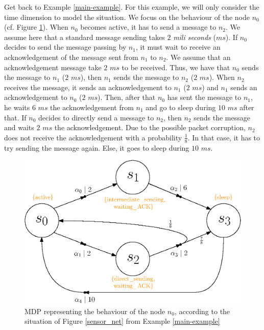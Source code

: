 \begin{example} \label{spg-example}
Get back to Example \ref{main-example}.
For this example, we will only consider the time dimension to model the situation.
We focus on the behaviour of the node $n_0$  (cf. Figure \ref{sensor_net_mdp}).
When $n_0$ becomes active, it has to send a message to $n_2$. We assume here that a standard message sending takes $2$ \textit{mili seconds} ($ms$). If $n_0$ decides to send the message passing by $n_1$, it must wait to receive an acknowledgement of the message sent from $n_1$ to $n_2$. We assume that an acknowledgement message take $2$ $ms$ to be received.
Thus, we have that $n_0$ sends the message to $n_1$ ($2$ $ms$), then $n_1$ sends the message to $n_2$ ($2$ $ms$). When $n_2$ receives the message, it sends an acknowledgement to $n_1$ ($2$ $ms$) and $n_1$ sends an acknowledgement to $n_0$ ($2$ $ms$).
Then, after that $n_0$ has sent the message to $n_1$, he waits $6$ $ms$ the acknowledgement from $n_1$ and go to sleep during $10$ $ms$ after that. If $n_0$ decides to directly send a message to $n_2$, then $n_2$ sends the message and waits $2$ $ms$ the acknowledgement.
Due to the possible packet corruption, $n_2$ does not receive the acknowledgement with a probability $\frac{1}{8}$. In that case, it has to try sending the message again.
Else, it goes to sleep during $10$ $ms$.
\begin{figure}[h]
  \centering
  \includegraphics[width=0.6\linewidth]{resources/example3.eps}
  \captionsetup{justification=centering}
  \caption{MDP representing the behaviour of the node $n_0$, according to the situation of Figure \ref{sensor_net} from Example \ref{main-example}}\label{sensor_net_mdp}
\end{figure}


\end{example}

